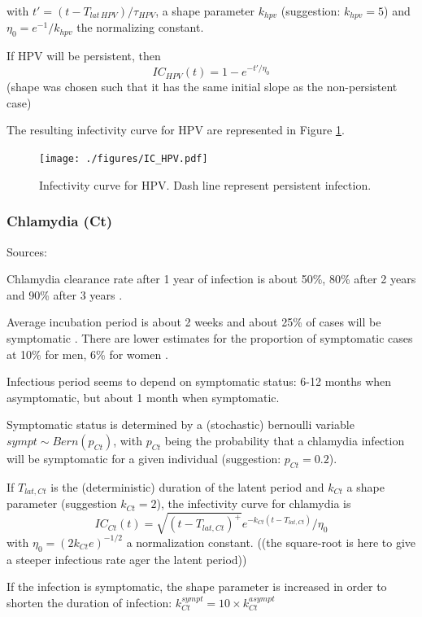 \documentclass[11pt, onecolumn]{article}
\begin{document}
with $t' = (t-T_{lat\,HPV})/\tau_{HPV} $, a shape parameter $k_{hpv}$ (suggestion: $k_{hpv}=5$) and $\eta_0=e^{-1}/k_{hpv}$ the normalizing constant.

If HPV will be persistent, then 
$$IC_{HPV}(t) = 1- e^{-t'/\eta_0 }$$
(shape was chosen such that it has the same initial slope as the non-persistent case)

The resulting infectivity curve for HPV are represented in Figure \ref{fig:ICHPV}.
\begin{figure}[!ht]
\centering
    \texttt{[image: ./figures/IC\_HPV.pdf]}
\caption{Infectivity curve for HPV. Dash line represent persistent infection.}
\label{fig:ICHPV}
\end{figure}



\subsubsection{Chlamydia (Ct)}

Sources: \cite{Geisler:2010bc, Althaus:2011dc}

Chlamydia clearance rate after 1 year of infection is about 50\%, 80\% after 2 years and 90\% after 3 years \cite{Geisler:2010bc}.

Average incubation period is about 2 weeks and about 25\% of cases will be symptomatic \cite{Althaus:2011dc}. There are lower estimates for the proportion of symptomatic cases at 10\% for men, 6\% for women \cite{Kretzschmar:1996ur}.

Infectious period seems to depend on symptomatic status: 6-12 months when asymptomatic, but about 1 month when symptomatic\cite{Kretzschmar:1996ur}.

Symptomatic status is determined by a (stochastic) bernoulli variable $sympt\sim Bern(p_{Ct})$, with $p_{Ct}$ being the probability that a chlamydia infection will be symptomatic for a given individual (suggestion: $p_{Ct}=0.2$).

If $T_{lat,Ct}$ is the (deterministic) duration of the latent period and $k_{Ct}$ a shape parameter (suggestion $k_{Ct}=2$), the infectivity curve for chlamydia is
$$IC_{Ct}(t) = \sqrt{(t-T_{lat,Ct})^+}e^{-k_{Ct} (t-T_{lat,Ct})}/\eta_0$$
with $\eta_0=(2k_{Ct}e)^{-1/2}$ a normalization constant. ((the square-root is here to give a steeper infectious rate ager the latent period))

If the infection is symptomatic, the shape parameter is increased in order to shorten the duration of infection: $k_{Ct}^{sympt} =10\times k_{Ct}^{asympt}$
\end{document}
